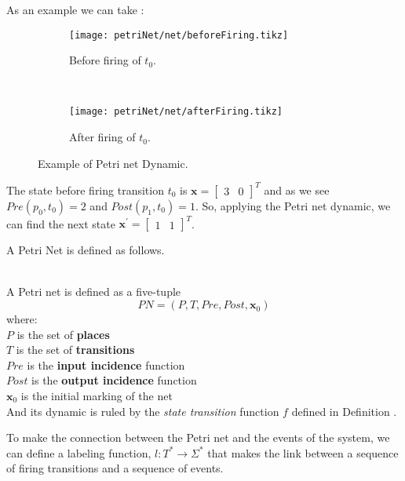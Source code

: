 As an example we can take :
\begin{figure}[H]
  \centering
 \begin{subfigure}[t]{0.45\textwidth}
  \centering
  \texttt{[image: petriNet/net/beforeFiring.tikz]}
  \caption{Before firing of $t_0$.}
  \label{fig:beforeFiring}
\end{subfigure}
~
\begin{subfigure}[t]{0.45\textwidth}
  \centering
  \texttt{[image: petriNet/net/afterFiring.tikz]}
  \caption{After firing of $t_0$.}
  \label{fig:afterFiring}
\end{subfigure}
  \caption{Example of Petri net Dynamic.}
  \label{fig:petriNetDynamics}
\end{figure}
The state before firing transition $t_0$ is $\mathbf{x}=\begin{bmatrix}3&
  0\end{bmatrix}^T$ and as we see $Pre(p_0,t_0)=2$ and $Post(p_1,t_0)=1$. So, applying the Petri net dynamic, we can find the next state $\mathbf{x}^\prime=\begin{bmatrix}1&
  1\end{bmatrix}^T$.

A Petri Net is defined as follows.

\begin{definition}
  \label{def:petriNet}~\\
  A Petri net is defined as a five-tuple
  \[PN = (P,T,Pre,Post,\mathbf{x}_0)\]
  where: \\
  \indent $P$ is the set of \textbf{places} \\
  \indent $T$ is the set of \textbf{transitions} \\
  \indent $Pre$ is the \textbf{input incidence} function  \\
  \indent $Post$ is the \textbf{output incidence} function\\
\indent $\mathbf{x}_0$ is the initial marking of the net \\
And its dynamic is ruled by the \emph{state transition} function $f$ defined in
Definition .

\end{definition}

To make the connection between the Petri net and the events of the system, we can
define a labeling function, $l : T^* \rightarrow \Sigma^*$ that makes the link between a
sequence of firing transitions and a sequence of events.

